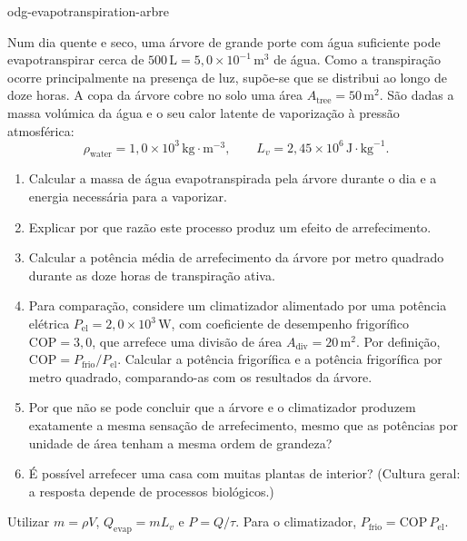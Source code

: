 \begin{exo}{odg-evapotranspiration-arbre}

Num dia quente e seco, uma árvore de grande porte com água suficiente pode evapotranspirar cerca de $500\,\text{L}=5{,}0\times10^{-1}\,\text{m}^3$ de água. Como a transpiração ocorre principalmente na presença de luz, supõe-se que se distribui ao longo de doze horas. A copa da árvore cobre no solo uma área $A_{\text{tree}}=50\,\text{m}^2$. São dadas a massa volúmica da água e o seu calor latente de vaporização à pressão atmosférica:
\[
\rho_{\text{water}}=1{,}0\times10^3\,\text{kg}\!\cdot\!\text{m}^{-3},
\qquad L_v=2{,}45\times10^6\,\text{J}\!\cdot\!\text{kg}^{-1}.
\]

\begin{enumerate}
  \item Calcular a massa de água evapotranspirada pela árvore durante o dia e a energia necessária para a vaporizar.
  \item Explicar por que razão este processo produz um efeito de arrefecimento.
  \item Calcular a potência média de arrefecimento da árvore por metro quadrado durante as doze horas de transpiração ativa.
  \item Para comparação, considere um climatizador alimentado por uma potência elétrica $P_{\mathrm{el}}=2{,}0\times10^3\,\text{W}$, com coeficiente de desempenho frigorífico $\mathrm{COP}=3{,}0$, que arrefece uma divisão de área $A_{\text{div}}=20\,\text{m}^2$. Por definição, $\mathrm{COP}=P_{\text{frio}}/P_{\mathrm{el}}$. Calcular a potência frigorífica e a potência frigorífica por metro quadrado, comparando-as com os resultados da árvore.
  \item Por que não se pode concluir que a árvore e o climatizador produzem exatamente a mesma sensação de arrefecimento, mesmo que as potências por unidade de área tenham a mesma ordem de grandeza?
  \item É possível arrefecer uma casa com muitas plantas de interior? (Cultura geral: a resposta depende de processos biológicos.)
\end{enumerate}

\begin{indication}
Utilizar $m=\rho V$, $Q_{\mathrm{evap}}=mL_v$ e $P=Q/\tau$. Para o climatizador, $P_{\text{frio}}=\mathrm{COP}\,P_{\mathrm{el}}$.
\end{indication}


\end{exo}
